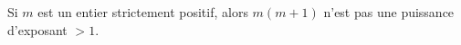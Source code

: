 Si $m$ est un entier strictement positif, alors $m(m + 1)$ n'est pas une puissance d'exposant $> 1$.
